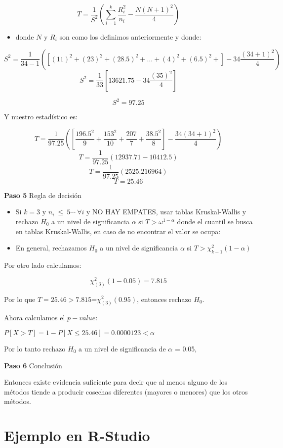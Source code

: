 \documentclass[
  a4paper,
  oneside,
  openany]{book}
\providecommand{\tightlist}{%
  \setlength{\itemsep}{0pt}\setlength{\parskip}{0pt}}
\begin{document}
\[T= \frac{1}{S^2}\left(\sum_{i=1}^{k}\frac{R^2_{i}}{n_{i}}-\frac{N(N+1)^2}{4}\right)\]

\begin{itemize}
\tightlist
\item
  donde \(N\) y \(R_{i}\) son como los definimos anteriormente y donde:
\end{itemize}

\[ S^2 = \frac{1}{34-1}\left(\left[(11)^2+(23)^2+(28.5)^2+\ldots+(4)^2+(6.5)^2+\right]-34\frac{(34+1)^2}{4}\right)\]
\[S^2 = \frac{1}{33}\left[13621.75-34\frac{(35)^2}{4}\right]\]

\[S^2 = 97.25\]

Y nuestro estadístico es:

\[T= \frac{1}{97.25}\left(\left[\frac{196.5^2}{9}+\frac{153^2}{10}+\frac{207}{7}+\frac{38.5^2}{8}\right]-\frac{34(34+1)^2}{4}\right)\]
\[T= \frac{1}{97.25}\left(12937.71-10412.5\right)\]
\[T= \frac{1}{97.25}\left(2525.216964\right)\]
\[T= 25.46\]

\textbf{Paso 5} Regla de decisión

\begin{itemize}
\item
  Si \(k =3\) y \(n_{i} \ \leq \ 5 \cdots \ \forall i\) y NO HAY EMPATES, usar tablas Kruskal-Wallis y rechazo \(H_0\) a un nivel de significancia \(\alpha\) si \(T > \omega^{1-\alpha}\) donde el cuantil se busca en tablas Kruskal-Wallis, en caso de no encontrar el valor se ocupa:
\item
  En general, rechazamos \(H_0\) a un nivel de significancia \(\alpha\) si \(T > \chi_{k-1}^2(1- \alpha)\)
\end{itemize}

Por otro lado calculamos:

\[\chi_{(3)}^2(1-0.05)=7.815\]

Por lo que \(T=25.46 > 7.815\)=\(\chi_{(3)}^2(0.95)\), entonces rechazo \(H_0\).

Ahora calculamos el \(p-value\):

\(P[X>T]= 1-P[X\leq 25.46]=0.0000123 < \alpha\)

Por lo tanto rechazo \(H_0\) a un nivel de significancia de \(\alpha\) = 0.05,

\textbf{Paso 6} Conclusión

Entonces existe evidencia suficiente para decir que al menos alguno de los métodos tiende a producir cosechas diferentes (mayores o menores) que los otros métodos.

\hypertarget{ejemplo-en-r-studio-6}{%
\section{Ejemplo en R-Studio}\label{ejemplo-en-r-studio-6}}
\end{document}
